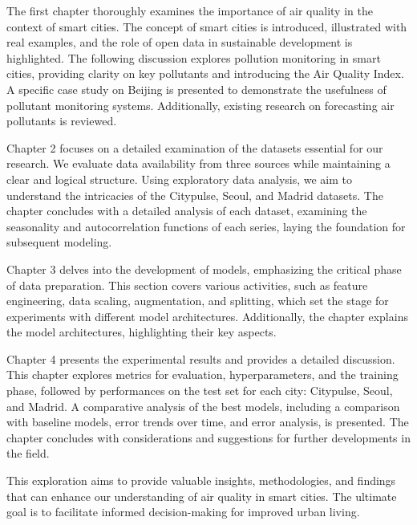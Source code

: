 The first chapter thoroughly examines the importance of air quality in the context of smart cities. The concept of smart cities is introduced, illustrated with real examples, and the role of open data in sustainable development is highlighted. The following discussion explores pollution monitoring in smart cities, providing clarity on key pollutants and introducing the Air Quality Index. A specific case study on Beijing is presented to demonstrate the usefulness of pollutant monitoring systems. Additionally, existing research on forecasting air pollutants is reviewed.

Chapter 2 focuses on a detailed examination of the datasets essential for our research. We evaluate data availability from three sources while maintaining a clear and logical structure. Using exploratory data analysis, we aim to understand the intricacies of the Citypulse, Seoul, and Madrid datasets. The chapter concludes with a detailed analysis of each dataset, examining the seasonality and autocorrelation functions of each series, laying the foundation for subsequent modeling.

Chapter 3 delves into the development of models, emphasizing the critical phase of data preparation. This section covers various activities, such as feature engineering, data scaling, augmentation, and splitting, which set the stage for experiments with different model architectures. Additionally, the chapter explains the model architectures, highlighting their key aspects.

Chapter 4 presents the experimental results and provides a detailed discussion. This chapter explores metrics for evaluation, hyperparameters, and the training phase, followed by performances on the test set for each city: Citypulse, Seoul, and Madrid. A comparative analysis of the best models, including a comparison with baseline models, error trends over time, and error analysis, is presented. The chapter concludes with considerations and suggestions for further developments in the field.

This exploration aims to provide valuable insights, methodologies, and findings that can enhance our understanding of air quality in smart cities. The ultimate goal is to facilitate informed decision-making for improved urban living.